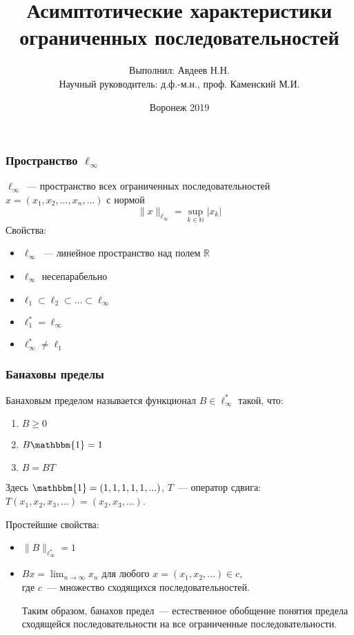 \documentclass[10pt,pdf,hyperref={unicode},aspectratio=169]{beamer}
\theoremstyle{definition}
\begin{document}
{
	
}


\title{Асимптотические характеристики \\ ограниченных последовательностей}
\author{Выполнил: Авдеев Н.Н. \\ Научный руководитель: д.ф.-м.н., проф. Каменский М.И.}
\date{Воронеж 2019}

\maketitle


\begin{frame}
	\frametitle{Пространство $\ell_\infty$}
	$\ell_\infty$~--- пространство всех ограниченных последовательностей
	$x=(x_1, x_2, ..., x_n, ...)$
	с нормой
	$$
		\|x\|_{\ell_\infty} = \sup_{k\in\mathbb{N}} |x_k|
	$$
	{Свойства:}

	\begin{itemize}
		\item
			$\ell_\infty$~--- линейное пространство над полем $\mathbb{R}$
		\item
			$\ell_\infty$  несепарабельно
		\item
			$\ell_1 \subset \ell_2 \subset \dots \subset \ell_\infty$
		\item
			$\ell_1^* = \ell_\infty$
		\item
			$\ell_\infty^* \neq \ell_1$
	\end{itemize}
\end{frame}

\begin{frame}\frametitle{Банаховы пределы}
	Банаховым пределом называется функционал $B\in \ell_\infty^*$ такой, что:
	\begin{enumerate}
		\item
			$B \geqslant 0$
		\item
			$B\mathbbm{1} = 1$
		\item
			$B=BT$
	\end{enumerate}
	Здесь $\mathbbm{1}=(1,1,1,1,1,...)$,
	$T$~--- оператор сдвига: $T(x_1, x_2, x_3, ...) = (x_2, x_3, ...)$.

	Простейшие свойства:
	\begin{itemize}
		\item
			$\|B\|_{\ell_\infty^*} = 1$
		\item
			$Bx = \lim_{n\to\infty} x_n$ для любого $x=(x_1, x_2, ...) \in c$,
			\\
			где $c$~--- множество сходящихся последовательностей.

			Таким образом,
			банахов предел~--- естественное обобщение понятия предела сходящейся последовательности
			на все ограниченные последовательности.
	\end{itemize}
\end{frame}
\end{document}
